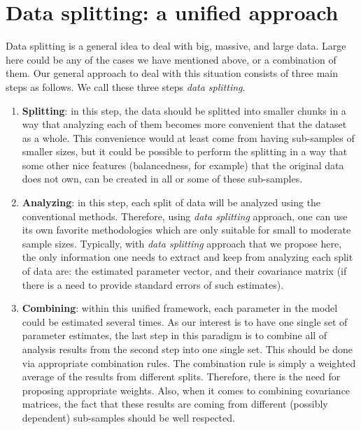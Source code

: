 \documentclass[11pt,a5paper,twoside]{book}
\begin{document}
\section{Data splitting: a unified approach}

Data splitting is a general idea to deal with big, massive, and large data. Large here could be any of the cases we have mentioned above, or a combination of them. Our general approach to deal with this situation consists of three main steps as follows. We call these three steps \textit{data splitting}.

\begin{enumerate}
\item \textbf{Splitting}: in this step, the data should be splitted into smaller chunks in a way that analyzing each of them becomes more convenient that the dataset as a whole. This convenience would at least come from having sub-samples of smaller sizes, but it could be possible to perform the splitting in a way that some other nice features (balancedness, for example) that the original data does not own, can be created in all or some of these sub-samples.

\item \textbf{Analyzing}: in this step, each split of data will be analyzed using the conventional methods. Therefore, using \emph{data splitting} approach, one can use its own favorite methodologies which are only suitable for small to moderate sample sizes. Typically, with \emph{data splitting} approach that we propose here, the only information one needs to extract and keep from analyzing each split of data are: the estimated parameter vector, and their covariance matrix (if there is a need to provide standard errors of such estimates).

\item \textbf{Combining}: within this unified framework, each parameter in the model could be estimated several times. As our interest is to have one single set of parameter estimates, the last step in this paradigm is to combine all of analysis results from the second step into one single set. This should be done via appropriate combination rules. The combination rule is simply a weighted average of the results from different splits. Therefore, there is the need for proposing appropriate weights. Also, when it comes to combining covariance matrices, the fact that these results are coming from different (possibly dependent) sub-samples should be well respected. 

\end{enumerate}
\end{document}
